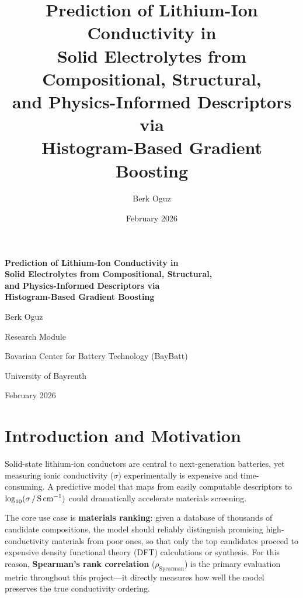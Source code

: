\documentclass[11pt,a4paper]{article}
\title{%
  \textbf{Prediction of Lithium-Ion Conductivity in\\
  Solid Electrolytes from Compositional, Structural,\\
  and Physics-Informed Descriptors via\\
  Histogram-Based Gradient Boosting}
}
\author{Berk Oguz}
\date{February 2026}
\newcommand{\logsigma}{\log_{10}(\sigma\,/\,\text{S\,cm}^{-1})}
\newcommand{\rhoS}{\rho_{\text{Spearman}}}
\begin{document}
\begin{titlepage}
      \centering
      {\LARGE\bfseries Prediction of Lithium-Ion Conductivity in\\[0.4em]
            Solid Electrolytes from Compositional, Structural,\\[0.4em]
            and Physics-Informed Descriptors via\\[0.4em]
            Histogram-Based Gradient Boosting\par}
      \vspace{2cm}
      {\Large Berk Oguz\par}
      \vspace{1.5cm}
      {\large Research Module\par}
      \vspace{0.5cm}
      {\large Bavarian Center for Battery Technology (BayBatt)\par}
      \vspace{0.3cm}
      {\large University of Bayreuth\par}
      \vspace{1.5cm}
      {\large February 2026\par}
\end{titlepage}

\tableofcontents
\newpage

\section{Introduction and Motivation}

Solid-state lithium-ion conductors are central to next-generation batteries, yet
measuring ionic conductivity ($\sigma$) experimentally is expensive and
time-consuming.  A predictive model that maps from easily computable descriptors
to $\logsigma$ could dramatically accelerate materials screening.

The core use case is \textbf{materials ranking}: given a database of thousands
of candidate compositions, the model should reliably distinguish promising
high-conductivity materials from poor ones, so that only the top candidates
proceed to expensive density functional theory (DFT) calculations or synthesis.  For this reason,
\textbf{Spearman's rank correlation} ($\rhoS$) is the primary evaluation
metric throughout this project---it directly measures how well the model
preserves the true conductivity ordering.
\end{document}
